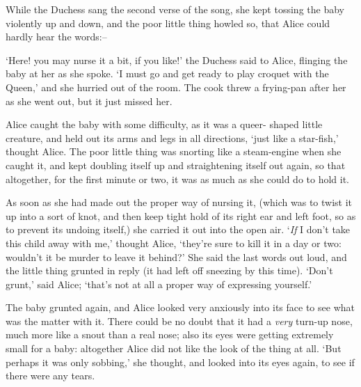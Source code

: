  While the Duchess sang the second verse of the song, she kept
tossing the baby violently up and down, and the poor little thing
howled so, that Alice could hardly hear the words:--
\onelineskip

\onelineskip

\onelineskip

\onelineskip

  `Here! you may nurse it a bit, if you like!' the Duchess said
to Alice, flinging the baby at her as she spoke.  `I must go and
get ready to play croquet with the Queen,' and she hurried out of
the room.  The cook threw a frying-pan after her as she went out,
but it just missed her.

  Alice caught the baby with some difficulty, as it was a queer-
shaped little creature, and held out its arms and legs in all
directions, `just like a star-fish,' thought Alice.  The poor
little thing was snorting like a steam-engine when she caught it,
and kept doubling itself up and straightening itself out again,
so that altogether, for the first minute or two, it was as much
as she could do to hold it.

  As soon as she had made out the proper way of nursing it,
(which was to twist it up into a sort of knot, and then keep
tight hold of its right ear and left foot, so as to prevent its
undoing itself,) she carried it out into the open air.  `{\it If} I
don't take this child away with me,' thought Alice, `they're sure
to kill it in a day or two:  wouldn't it be murder to leave it
behind?'  She said the last words out loud, and the little thing
grunted in reply (it had left off sneezing by this time).  `Don't
grunt,' said Alice; `that's not at all a proper way of expressing
yourself.'

  The baby grunted again, and Alice looked very anxiously into
its face to see what was the matter with it.  There could be no
doubt that it had a {\it very} turn-up nose, much more like a snout
than a real nose; also its eyes were getting extremely small for
a baby:  altogether Alice did not like the look of the thing at
all.  `But perhaps it was only sobbing,' she thought, and looked
into its eyes again, to see if there were any tears.

